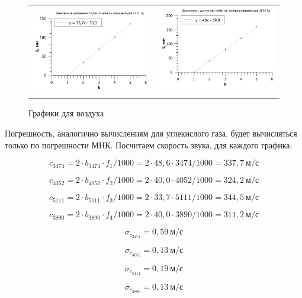 \documentclass[12pt,a4paper]{article}
\begin{document}
\begin{figure}[ht]\center
\begin{tabular}{cc}
\includegraphics[width=60mm]{V_3-1.jpg}
&
\includegraphics[width=60mm]{V_4-1.jpg}
\end{tabular}
\caption{Графики для воздуха}
\end{figure}

\vspace{0.5cm}

Погрешность, аналогично вычислениям для углекислого газа, будет вычисляться только по погрешности МНК. Посчитаем скорость звука, для каждого графика:

\[c_{3474} = 2 \cdot b_{3474} \cdot f_1 / 1000 = 2 \cdot 48,6 \cdot 3474 /1000 = 337,7 \: \textit{м}/\textit{с} \]

\[c_{4052} = 2 \cdot b_{4052} \cdot f_2 / 1000 = 2 \cdot 40,0 \cdot 4052 /1000 = 324,2 \: \textit{м}/\textit{с} \]

\[c_{5111} = 2 \cdot b_{5111} \cdot f_3 / 1000 = 2 \cdot 33,7 \cdot 5111 /1000 = 344,5 \: \textit{м}/\textit{с} \]

\[c_{3890} = 2 \cdot b_{3890} \cdot f_4 / 1000 = 2 \cdot 40,0 \cdot 3890 /1000 = 311,2 \: \textit{м}/\textit{с} \]

\[\sigma_{c_{3474}} = 0,59  \: \textit{м}/\textit{с}\]

\[\sigma_{c_{4052}} = 0,13  \: \textit{м}/\textit{с}\]

\[\sigma_{c_{5111}} = 0,19  \: \textit{м}/\textit{с}\]

\[\sigma_{c_{3890}} = 0,13  \: \textit{м}/\textit{с}\]

\vspace{0.5cm}
\end{document}
